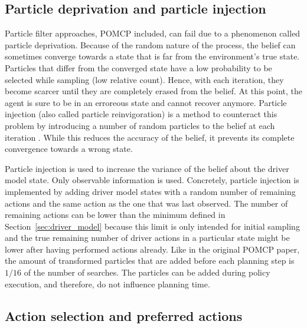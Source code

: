 \subsection{Particle deprivation and particle injection}
\label{sec:particle_deprivation}

Particle filter approaches, POMCP included, can fail due to a phenomenon called particle deprivation. Because of the random nature of the process, the belief can sometimes converge towards a state that is far from the environment's true state. Particles that differ from the converged state have a low probability to be selected while sampling (low relative count). Hence, with each iteration, they become scarcer until they are completely erased from the belief. At this point, the agent is sure to be in an erroreous state and cannot recover anymore. Particle injection (also called particle reinvigoration) is a method to counteract this problem by introducing a number of random particles to the belief at each iteration \parencite{decision_making_book}. While this reduces the accuracy of the belief, it prevents its complete convergence towards a wrong state. 

Particle injection is used to increase the variance of the belief about the driver model state. Only observable information is used. Concretely, particle injection is implemented by adding driver model states with a random number of remaining actions and the same action as the one that was last observed. The number of remaining actions can be lower than the minimum defined in Section~\ref{sec:driver_model} because this limit is only intended for initial sampling and the true remaining number of driver actions in a particular state might be lower after having performed actions already. Like in the original POMCP paper, the amount of transformed particles that are added before each planning step is $1/16$ of the number of searches. The particles can be added during policy execution, and therefore, do not influence planning time.



\subsection{Action selection and preferred actions}
\label{sec:action_selection}


